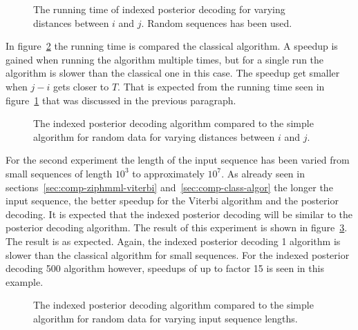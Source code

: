 \begin{figure}
  \centering
  
  \caption{The running time of indexed posterior decoding for varying distances
    between $i$ and $j$. Random sequences has been used.}
  \label{fig:assymptotic_indexed_posterior_subseq_length.tex}
\end{figure}

In figure~\ref{fig:indexed_posterior_speedup_vs_subseq} the running time is
compared the classical algorithm. A speedup is gained when running the
algorithm multiple times, but for a single run the algorithm is slower than the
classical one in this case. The speedup get smaller when $j - i$ gets closer to
$T$. That is expected from the running time seen in
figure~\ref{fig:assymptotic_indexed_posterior_subseq_length.tex} that was
discussed in the previous paragraph.

\begin{figure}
  \centering
  
  \caption{The indexed posterior decoding algorithm compared to the simple
    algorithm for random data for varying distances between $i$ and $j$.}
  \label{fig:indexed_posterior_speedup_vs_subseq}
\end{figure}

For the second experiment the length of the input sequence has been varied from
small sequences of length $10^3$ to approximately $10^7$. As already seen in
sections~\ref{sec:comp-ziphmml-viterbi} and~\ref{sec:comp-class-algor} the
longer the input sequence, the better speedup for the Viterbi algorithm and the
posterior decoding. It is expected that the indexed posterior
decoding will be similar to the posterior decoding algorithm. The
result of this experiment is shown in
figure~\ref{fig:indexed_posterior_speedup_vs_T}. The result is as
expected. Again, the indexed posterior decoding 1 algorithm is slower than
the classical algorithm for small sequences. For the indexed posterior
decoding 500 algorithm however, speedups of up to factor 15 is seen in this
example.

\begin{figure}
  \centering
  
  \caption{The indexed posterior decoding algorithm compared to the simple
    algorithm for random data for varying input sequence lengths.}
  \label{fig:indexed_posterior_speedup_vs_T}
\end{figure}

